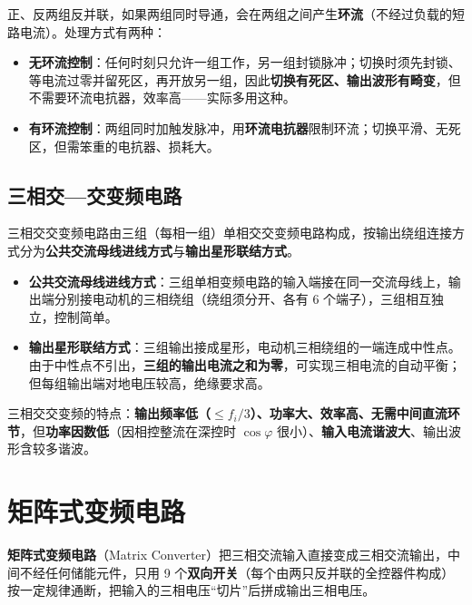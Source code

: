 正、反两组反并联，如果两组同时导通，会在两组之间产生\textbf{环流}（不经过负载的短路电流）。处理方式有两种：

\begin{itemize}
  \item \textbf{无环流控制}：任何时刻只允许一组工作，另一组封锁脉冲；切换时须先封锁、等电流过零并留死区，再开放另一组，因此\textbf{切换有死区、输出波形有畸变}，但不需要环流电抗器，效率高——实际多用这种。
  \item \textbf{有环流控制}：两组同时加触发脉冲，用\textbf{环流电抗器}限制环流；切换平滑、无死区，但需笨重的电抗器、损耗大。
\end{itemize}

\subsection{三相交—交变频电路}

三相交交变频电路由三组（每相一组）单相交交变频电路构成，按输出绕组连接方式分为\textbf{公共交流母线进线方式}与\textbf{输出星形联结方式}。

\begin{itemize}
  \item \textbf{公共交流母线进线方式}：三组单相变频电路的输入端接在同一交流母线上，输出端分别接电动机的三相绕组（绕组须分开、各有 6 个端子），三组相互独立，控制简单。
  \item \textbf{输出星形联结方式}：三组输出接成星形，电动机三相绕组的一端连成中性点。由于中性点不引出，\textbf{三组的输出电流之和为零}，可实现三相电流的自动平衡；但每组输出端对地电压较高，绝缘要求高。
\end{itemize}

三相交交变频的特点：\textbf{输出频率低（$\le f_i/3$）、功率大、效率高、无需中间直流环节}，但\textbf{功率因数低}（因相控整流在深控时 $\cos\varphi$ 很小）、\textbf{输入电流谐波大}、输出波形含较多谐波。

\section{矩阵式变频电路}

\textbf{矩阵式变频电路}（Matrix Converter）把三相交流输入直接变成三相交流输出，中间不经任何储能元件，只用 9 个\textbf{双向开关}（每个由两只反并联的全控器件构成）按一定规律通断，把输入的三相电压“切片”后拼成输出三相电压。

